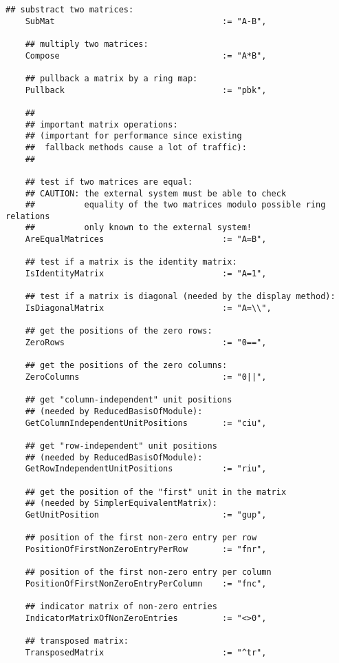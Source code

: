 \documentclass[a4paper,11pt]{report}
\begin{document}
{{{\begin{Verbatim}[fontsize=\small,frame=single,label=Code]
    ## substract two matrices:
    SubMat                                  := "A-B",
    
    ## multiply two matrices:
    Compose                                 := "A*B",
    
    ## pullback a matrix by a ring map:
    Pullback                                := "pbk",
    
    ##
    ## important matrix operations:
    ## (important for performance since existing
    ##  fallback methods cause a lot of traffic):
    ##
    
    ## test if two matrices are equal:
    ## CAUTION: the external system must be able to check
    ##          equality of the two matrices modulo possible ring relations
    ##          only known to the external system!
    AreEqualMatrices                        := "A=B",
    
    ## test if a matrix is the identity matrix:
    IsIdentityMatrix                        := "A=1",
    
    ## test if a matrix is diagonal (needed by the display method):
    IsDiagonalMatrix                        := "A=\\",
    
    ## get the positions of the zero rows:
    ZeroRows                                := "0==",
    
    ## get the positions of the zero columns:
    ZeroColumns                             := "0||",
    
    ## get "column-independent" unit positions
    ## (needed by ReducedBasisOfModule):
    GetColumnIndependentUnitPositions       := "ciu",
    
    ## get "row-independent" unit positions
    ## (needed by ReducedBasisOfModule):
    GetRowIndependentUnitPositions          := "riu",
    
    ## get the position of the "first" unit in the matrix
    ## (needed by SimplerEquivalentMatrix):
    GetUnitPosition                         := "gup",
    
    ## position of the first non-zero entry per row
    PositionOfFirstNonZeroEntryPerRow       := "fnr",
    
    ## position of the first non-zero entry per column
    PositionOfFirstNonZeroEntryPerColumn    := "fnc",
    
    ## indicator matrix of non-zero entries
    IndicatorMatrixOfNonZeroEntries         := "<>0",
    
    ## transposed matrix:
    TransposedMatrix                        := "^tr",
    

\end{Verbatim}}}}
\end{document}
